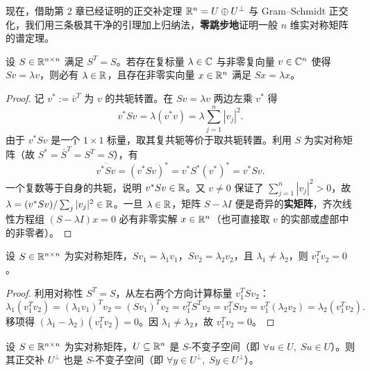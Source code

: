 现在，借助第 2 章已经证明的正交补定理 $\mathbb{R}^n = U \oplus U^\perp$ 与 Gram--Schmidt 正交化，我们用三条极其干净的引理加上归纳法，\textbf{零跳步地}证明一般 $n$ 维实对称矩阵的谱定理。

\begin{lemma}
\label{lem:ch3-real-eig}
设 $S \in \mathbb{R}^{n\times n}$ 满足 $S^T = S$。若存在复标量 $\lambda \in \mathbb{C}$ 与非零复向量 $v \in \mathbb{C}^n$ 使得 $Sv = \lambda v$，则必有 $\lambda \in \mathbb{R}$，且存在非零实向量 $x \in \mathbb{R}^n$ 满足 $Sx = \lambda x$。
\end{lemma}

\begin{proof}
记 $v^* := \bar{v}^T$ 为 $v$ 的共轭转置。在 $Sv = \lambda v$ 两边左乘 $v^*$ 得
\[
  v^* S v = \lambda (v^* v) = \lambda \sum_{j=1}^n |v_j|^2.
\]
由于 $v^* S v$ 是一个 $1\times 1$ 标量，取其复共轭等价于取共轭转置。利用 $S$ 为实对称矩阵（故 $S^* = \bar{S}^T = S^T = S$），有
\[
  \overline{v^* S v} = (v^* S v)^* = v^* S^* (v^*)^* = v^* S v.
\]
一个复数等于自身的共轭，说明 $v^* S v \in \mathbb{R}$。又 $v \neq 0$ 保证了 $\sum_{j=1}^n |v_j|^2 > 0$，故 $\lambda = (v^*Sv)/\sum_j |v_j|^2 \in \mathbb{R}$。一旦 $\lambda \in \mathbb{R}$，矩阵 $S - \lambda I$ 便是奇异的\textbf{实矩阵}，齐次线性方程组 $(S - \lambda I)x = 0$ 必有非零实解 $x \in \mathbb{R}^n$（也可直接取 $v$ 的实部或虚部中的非零者）。
\end{proof}

\begin{lemma}[互异特征值对应的特征向量正交]
\label{lem:ch3-ortho-eig}
设 $S \in \mathbb{R}^{n\times n}$ 为实对称矩阵，$Sv_1 = \lambda_1 v_1$，$Sv_2 = \lambda_2 v_2$，且 $\lambda_1 \neq \lambda_2$，则 $v_1^T v_2 = 0$。
\end{lemma}

\begin{proof}
利用对称性 $S^T = S$，从左右两个方向计算标量 $v_1^T S v_2$：
\[
  \lambda_1 (v_1^T v_2) = (\lambda_1 v_1)^T v_2 = (Sv_1)^T v_2 = v_1^T S^T v_2 = v_1^T S v_2 = v_1^T (\lambda_2 v_2) = \lambda_2 (v_1^T v_2).
\]
移项得 $(\lambda_1 - \lambda_2)(v_1^T v_2) = 0$。因 $\lambda_1 \neq \lambda_2$，故 $v_1^T v_2 = 0$。
\end{proof}

\begin{lemma}[不变子空间的正交补仍是不变子空间]
\label{lem:ch3-perp-inv}
设 $S \in \mathbb{R}^{n\times n}$ 为实对称矩阵，$U \subseteq \mathbb{R}^n$ 是 $S$-不变子空间（即 $\forall u \in U,\; Su \in U$）。则其正交补 $U^\perp$ 也是 $S$-不变子空间（即 $\forall y \in U^\perp,\; Sy \in U^\perp$）。
\end{lemma}

